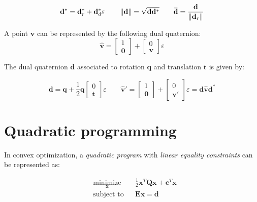 \documentclass[a4paper,10pt]{article}
\newcommand{\overbar}[1]{\mkern 1.5mu\overline{\mkern-1.5mu#1\mkern-1.5mu}\mkern 1.5mu}
\begin{document}
\begin{multicols}{2}
\begin{equation*}
\mathbf{d}^* = \mathbf{d}_r^* + \mathbf{d}_d^* \varepsilon
\qquad
\left\|\mathbf{d}\right\| = \sqrt{\mathbf{d}\mathbf{d}^*}
\qquad
\overbar{\mathbf{d}} = \frac{\mathbf{d}}{\left\|\mathbf{d}_r\right\|}
\end{equation*}

A point $\mathbf{v}$ can be represented by the following dual quaternion:
\begin{equation*}
\hat{\mathbf{v}} = \begin{bmatrix}1 \\ \mathbf{0} \end{bmatrix} + \begin{bmatrix}0 \\ \mathbf{v} \end{bmatrix} \varepsilon
\end{equation*}

The dual quaternion $\mathbf{d}$ associated to rotation $\mathbf{q}$ and translation $\mathbf{t}$ is given by:

\begin{equation*}
\mathbf{d} = \mathbf{q} + \frac{1}{2} \mathbf{q} \begin{bmatrix}0 \\ \mathbf{t} \end{bmatrix} \varepsilon
\qquad
\hat{\mathbf{v}}' = \begin{bmatrix}1 \\ \mathbf{0} \end{bmatrix} + \begin{bmatrix}0 \\ \mathbf{v}' \end{bmatrix} \varepsilon = \mathbf{d} \hat{\mathbf{v}} \mathbf{d} ^*
\end{equation*} %


\section{Quadratic programming}
\label{section:quadratic}

In convex optimization, a \emph{quadratic program} with \emph{linear equality constraints} can be represented as:

\begin{equation*}
\begin{aligned}
& \underset{\mathbf{x}}{\text{minimize}} & & \frac{1}{2} \mathbf{x}^T \mathbf{Q} \mathbf{x} + \mathbf{c}^T \mathbf{x} \\
& \text{subject to} & & \mathbf{E}\mathbf{x} = \mathbf{d}
\end{aligned}
\end{equation*}


\end{multicols}
\end{document}
